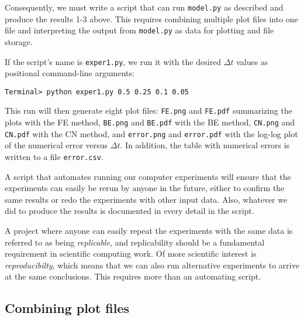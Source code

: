 \documentclass[graybox,sectrefs,envcountresetchap,open=right,final]{svmonodo}
\newenvironment{warning_mdfboxadmon}[1][]{
\begin{warning_mdfboxmdframed}[frametitle=#1]
}
{
\end{warning_mdfboxmdframed}
}
\begin{document}
\noindent
Consequently, we must write a script that can run \texttt{model.py} as described and
produce the results 1-3 above. This requires combining multiple plot files into
one file and interpreting the output from \texttt{model.py} as data for plotting and
file storage.

If the script's name is \texttt{exper1.py}, we run it with the desired $\Delta t$
values as positional command-line arguments:



\begin{Verbatim}[frame=lines,label=\fbox{{\tiny Terminal}},framesep=2.5mm,framerule=0.7pt,fontsize=\fontsize{9pt}{9pt}]
Terminal> python exper1.py 0.5 0.25 0.1 0.05

\end{Verbatim}

This run will then generate eight plot files: \texttt{FE.png} and \texttt{FE.pdf} summarizing
the plots with the FE method, \texttt{BE.png} and \texttt{BE.pdf} with
the BE method, \texttt{CN.png} and \texttt{CN.pdf} with the CN method, and \texttt{error.png}
and \texttt{error.pdf} with the log-log plot of the numerical error versus $\Delta t$.
In addition, the table with numerical errors is written to a
file \texttt{error.csv}.



\begin{warning_mdfboxadmon}
A script that automates running our computer experiments
will ensure
that the experiments can easily be rerun by anyone in
the future, either to confirm the same results or redo the experiments with
other input data.
Also, whatever we did to produce the results is
documented in every detail in the script.

A project where anyone can easily repeat the experiments with the same data
is referred to as being \emph{replicable}, and replicability
should be a fundamental requirement in scientific computing work.
Of more scientific interest is \emph{reproducibilty}, which means that we can
also run alternative experiments to arrive at the same conclusions.
This requires more than an automating script.
\end{warning_mdfboxadmon} %



\subsection{Combining plot files}
\end{document}
